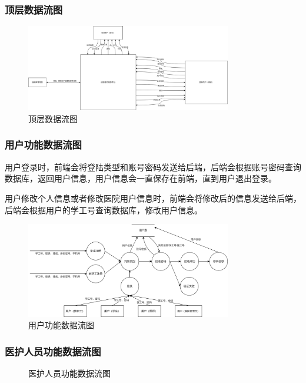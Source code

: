 \documentclass{article}
\begin{document}
\subsubsection{顶层数据流图}

\begin{figure}[H]
    \centering
    \includegraphics[width=0.8\textwidth]{images/all_dataflow.png}
    \caption{顶层数据流图}
\end{figure}

\subsubsection{用户功能数据流图}

用户登录时，前端会将登陆类型和账号密码发送给后端，后端会根据账号密码查询数据库，返回用户信息，用户信息会一直保存在前端，直到用户退出登录。

用户修改个人信息或者修改医院用户信息时，前端会将修改后的信息发送给后端，后端会根据用户的学工号查询数据库，修改用户信息。

\begin{figure}[H]
    \centering
    \includegraphics[width=0.8\textwidth]{images/user_dataflow.png}
    \caption{用户功能数据流图}
\end{figure}

\subsubsection{医护人员功能数据流图}

\begin{figure}[H]
    \centering
    \caption{医护人员功能数据流图}
\end{figure}
\end{document}
